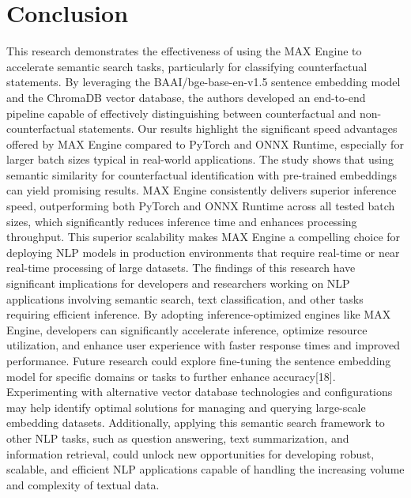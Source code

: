 \documentclass[conference]{IEEEtran}
\begin{document}
\section{Conclusion}
This research demonstrates the effectiveness of using the MAX Engine to accelerate semantic search tasks, particularly for classifying counterfactual statements. By leveraging the BAAI/bge-base-en-v1.5 sentence embedding model and the ChromaDB vector database, the authors developed an end-to-end pipeline capable of effectively distinguishing between counterfactual and non-counterfactual statements. Our results highlight the significant speed advantages offered by MAX Engine compared to PyTorch and ONNX Runtime, especially for larger batch sizes typical in real-world applications. The study shows that using semantic similarity for counterfactual identification with pre-trained embeddings can yield promising results. MAX Engine consistently delivers superior inference speed, outperforming both PyTorch and ONNX Runtime across all tested batch sizes, which significantly reduces inference time and enhances processing throughput. This superior scalability makes MAX Engine a compelling choice for deploying NLP models in production environments that require real-time or near real-time processing of large datasets. The findings of this research have significant implications for developers and researchers working on NLP applications involving semantic search, text classification, and other tasks requiring efficient inference. By adopting inference-optimized engines like MAX Engine, developers can significantly accelerate inference, optimize resource utilization, and enhance user experience with faster response times and improved performance. Future research could explore fine-tuning the sentence embedding model for specific domains or tasks to further enhance accuracy[18]. Experimenting with alternative vector database technologies and configurations may help identify optimal solutions for managing and querying large-scale embedding datasets. Additionally, applying this semantic search framework to other NLP tasks, such as question answering, text summarization, and information retrieval, could unlock new opportunities for developing robust, scalable, and efficient NLP applications capable of handling the increasing volume and complexity of textual data.
\end{document}

